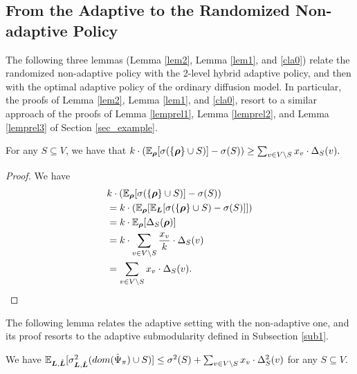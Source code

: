 \subsection{From the Adaptive to the Randomized Non-adaptive Policy}\label{sub3}
The following three lemmas (Lemma \ref{lem2}, Lemma \ref{lem1}, and \ref{cla0}) relate the randomized non-adaptive policy with the 2-level hybrid adaptive policy, and then with the optimal adaptive policy of the ordinary diffusion model. In particular, the proofs of Lemma \ref{lem2}, Lemma \ref{lem1}, and \ref{cla0}, resort to a similar approach of the proofs of Lemma \ref{lemprel1}, Lemma \ref{lemprel2}, and Lemma \ref{lemprel3} of Section \ref{sec_example}.


\begin{lemma}\label{lem2}
For any $S\subseteq V$, we have that $k \cdot (\mathbb{E}_{\bm \rho}[\sigma(\{\bm \rho\}\cup S)]-\sigma(S))\geq \sum_{v\in V\setminus S}x_v\cdot \Delta_S(v).$
\end{lemma}

\begin{proof}
We have
\begin{align}
&k \cdot (\mathbb{E}_{\bm \rho}[\sigma(\{\bm \rho\}\cup S)]-\sigma(S))\nonumber\\
&=k \cdot (\mathbb{E}_{\bm \rho}[\mathbb{E}_{\bm L}[\sigma(\{\bm \rho\}\cup S)-\sigma(S)]])\nonumber\\
& =k\cdot \mathbb{E}_{\bm \rho}[\Delta_S(\bm \rho )]\nonumber\\
&=k\cdot \sum_{v\in V\setminus S}\frac{x_v}{k} \cdot \Delta_S(v)\nonumber\\
&= \sum_{v\in V\setminus S}{x_v}\cdot \Delta_S(v)\nonumber.
\end{align}
\end{proof}





The following lemma relates the adaptive setting with the non-adaptive one, and its proof resorts to the adaptive submodularity defined in Subsection \ref{sub1}. 
\begin{lemma}\label{lem1}
We have $\mathbb{E}_{\bm L,\hat{\bm L}}[\sigma^2_{\bm L,\hat{\bm L}}(dom(\hat{\Psi}_{\pi})\cup S)]\leq \sigma^2(S)+\sum_{v\in V\setminus S}x_v\cdot \Delta^2_S(v)$ for any $S\subseteq V$. 
\end{lemma}

